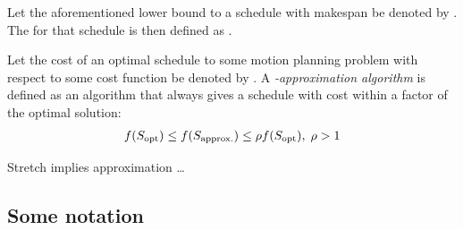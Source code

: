 \begin{definition}
	Let the aforementioned lower bound to a schedule with makespan  be denoted by . The  for that schedule is then defined as .
\end{definition}

Let the cost of an optimal schedule \ilmath{\sopt} to some motion planning problem with respect to some cost function  be denoted by . A \ilmath{\rho}\emph{-approximation algorithm} is defined as an algorithm that always gives a schedule with cost within a \ilmath{\rho} factor of the optimal solution:
\begin{align}\label{def:approximation_algorithm}
	f(S_\text{opt}) \leq f(S_\text{approx.}) \leq \rho f(S_\text{opt}), \; \rho > 1
\end{align}

\begin{remark}
	Stretch implies approximation \dots
\end{remark}




\subsection{Some notation}

\begin{definition}
\end{definition}



